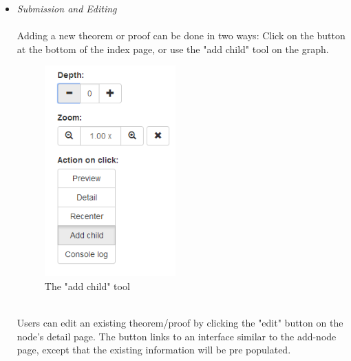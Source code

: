 \documentclass{acm_proc_article-sp}
\begin{document}
\begin{itemize}
\item \emph{Submission and Editing} \\\\
Adding a new theorem or proof can be done in two ways: 
Click on the button at the bottom of the index page, or use the "add child" tool on the graph. 
\begin{figure}[h!]
\centering
\includegraphics[scale=0.4]{add_child.png}
\caption{The "add child" tool}
\end{figure}\\
Users can edit an existing theorem/proof by clicking the "edit" button on the node's detail page. The button links to an interface similar to the add-node page, except that the existing information will be pre populated. 


\end{itemize}
\end{document}
